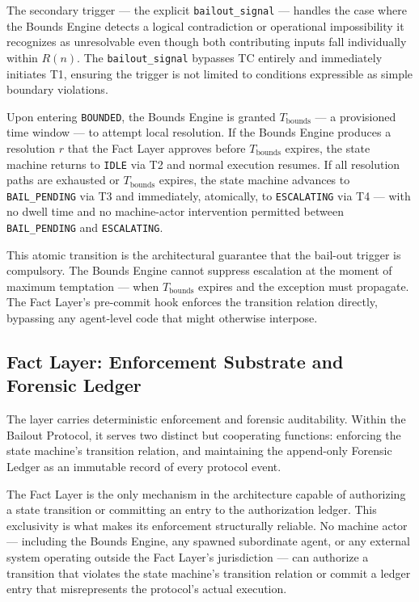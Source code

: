 The secondary trigger — the explicit \texttt{bailout\_signal} — handles the case where the Bounds Engine detects a logical contradiction or operational impossibility it recognizes as unresolvable even though both contributing inputs fall individually within $R(n)$. The \texttt{bailout\_signal} bypasses TC entirely and immediately initiates T1, ensuring the trigger is not limited to conditions expressible as simple boundary violations.

Upon entering \texttt{BOUNDED}, the Bounds Engine is granted $T_{\mathrm{bounds}}$ — a provisioned time window — to attempt local resolution. If the Bounds Engine produces a resolution $r$ that the Fact Layer approves before $T_{\mathrm{bounds}}$ expires, the state machine returns to \texttt{IDLE} via T2 and normal execution resumes. If all resolution paths are exhausted or $T_{\mathrm{bounds}}$ expires, the state machine advances to \texttt{BAIL\_PENDING} via T3 and immediately, atomically, to \texttt{ESCALATING} via T4 — with no dwell time and no machine-actor intervention permitted between \texttt{BAIL\_PENDING} and \texttt{ESCALATING}.

This atomic transition is the architectural guarantee that the bail-out trigger is compulsory. The Bounds Engine cannot suppress escalation at the moment of maximum temptation — when $T_{\mathrm{bounds}}$ expires and the exception must propagate. The Fact Layer's pre-commit hook enforces the transition relation directly, bypassing any agent-level code that might otherwise interpose.

\subsection{Fact Layer: Enforcement Substrate and Forensic Ledger}\label{sec:fact-layer}

The \fact{} layer carries deterministic enforcement and forensic auditability. Within the Bailout Protocol, it serves two distinct but cooperating functions: enforcing the state machine's transition relation, and maintaining the append-only Forensic Ledger as an immutable record of every protocol event.

The Fact Layer is the only mechanism in the \bxthree{} architecture capable of authorizing a state transition or committing an entry to the authorization ledger. This exclusivity is what makes its enforcement structurally reliable. No machine actor — including the Bounds Engine, any spawned subordinate agent, or any external system operating outside the Fact Layer's jurisdiction — can authorize a transition that violates the state machine's transition relation or commit a ledger entry that misrepresents the protocol's actual execution.

